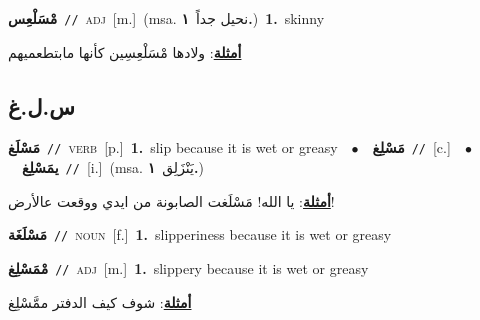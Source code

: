 \documentclass[10pt,a4paper,twoside]{article} %
\begin{document}
\begin{multicols}{2}
{\setlength\topsep{0pt}\textbf{\foreignlanguage{arabic}{مْسَلْعِس}}\ {\color{gray}\texttt{//}\color{black}}\ \textsc{adj}\ [m.]\ \color{gray}(msa. \foreignlanguage{arabic}{نحيل جداً}~\foreignlanguage{arabic}{\textbf{١.}})\color{black}\ \textbf{1.}~skinny\  \begin{flushright}\color{gray}\foreignlanguage{arabic}{\textbf{\underline{\foreignlanguage{arabic}{أمثلة}}}: ولادها مْسَلْعِسِين كأنها مابتطعميهم}\end{flushright}\color{black}} \vspace{2mm}

\vspace{-3mm}
\subsection*{\color{blue}\foreignlanguage{arabic}{س.ل.غ}\color{blue}{}} 

{\setlength\topsep{0pt}\textbf{\foreignlanguage{arabic}{مَسْلَغ}}\ {\color{gray}\texttt{//}\color{black}}\ \textsc{verb}\ [p.]\ \textbf{1.}~slip because it is wet or greasy\ \ $\bullet$\ \ \setlength\topsep{0pt}\textbf{\foreignlanguage{arabic}{مَسْلِغ}}\ {\color{gray}\texttt{//}\color{black}}\ [c.]\ \ $\bullet$\ \ \setlength\topsep{0pt}\textbf{\foreignlanguage{arabic}{يمَسْلِغ}}\ {\color{gray}\texttt{//}\color{black}}\ [i.]\ \color{gray}(msa. \foreignlanguage{arabic}{يَنْزَلِق}~\foreignlanguage{arabic}{\textbf{١.}})\color{black}\  \begin{flushright}\color{gray}\foreignlanguage{arabic}{\textbf{\underline{\foreignlanguage{arabic}{أمثلة}}}: يا الله! مَسْلَغت الصابونة من ايدي ووقعت عالأرض!}\end{flushright}\color{black}} \vspace{2mm}

{\setlength\topsep{0pt}\textbf{\foreignlanguage{arabic}{مَسْلَغَة}}\ {\color{gray}\texttt{//}\color{black}}\ \textsc{noun}\ [f.]\ \textbf{1.}~slipperiness because it is wet or greasy\ } \vspace{2mm}

{\setlength\topsep{0pt}\textbf{\foreignlanguage{arabic}{مْمَسْلِغ}}\ {\color{gray}\texttt{//}\color{black}}\ \textsc{adj}\ [m.]\ \textbf{1.}~slippery because it is wet or greasy\  \begin{flushright}\color{gray}\foreignlanguage{arabic}{\textbf{\underline{\foreignlanguage{arabic}{أمثلة}}}: شوف كيف الدفتر ممَّسْلِغ}\end{flushright}\color{black}} \vspace{2mm}


\end{multicols}
\end{document}
